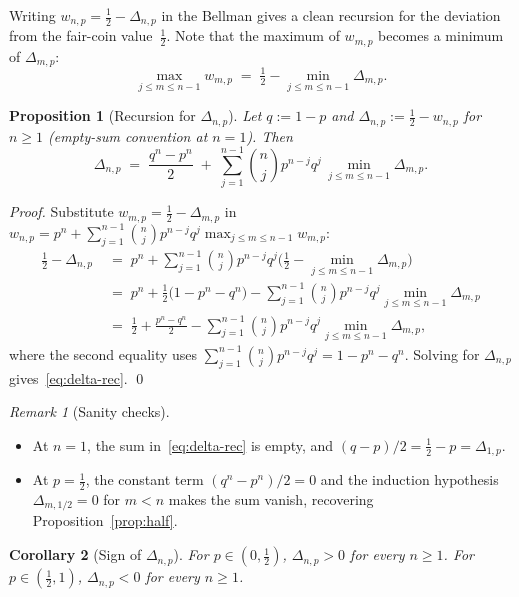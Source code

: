 \documentclass{article}
\newtheorem{proposition}{Proposition}
\newtheorem{corollary}[proposition]{Corollary}
\theoremstyle{remark}
\newtheorem*{remark}{Remark}
\begin{document}
Writing $w_{n,p}=\tfrac12-\Delta_{n,p}$ in the Bellman gives a clean
recursion for the deviation from the fair-coin value~$\tfrac12$. Note
that the maximum of $w_{m,p}$ becomes a minimum of $\Delta_{m,p}$:
\[
  \max_{j\le m\le n-1}w_{m,p}\;=\;\tfrac12-\min_{j\le m\le n-1}\Delta_{m,p}.
\]

\begin{proposition}[Recursion for $\Delta_{n,p}$]\label{prop:delta-rec}
Let $q:=1-p$ and $\Delta_{n,p}:=\tfrac12-w_{n,p}$ for $n\ge 1$
(empty-sum convention at $n=1$). Then
\begin{equation}\label{eq:delta-rec}
  \Delta_{n,p}\;=\;\frac{q^n-p^n}{2}
  \;+\;\sum_{j=1}^{n-1}\binom{n}{j}p^{n-j}q^{j}\,
       \min_{j\le m\le n-1}\Delta_{m,p}.
\end{equation}
\end{proposition}

\begin{proof}
Substitute $w_{m,p}=\tfrac12-\Delta_{m,p}$ in
$w_{n,p}=p^n+\sum_{j=1}^{n-1}\binom{n}{j}p^{n-j}q^{j}\max_{j\le m\le n-1}w_{m,p}$:
\begin{align*}
  \tfrac12-\Delta_{n,p}
  &\;=\;p^n+\sum_{j=1}^{n-1}\binom{n}{j}p^{n-j}q^{j}
       \bigl(\tfrac12-\min_{j\le m\le n-1}\Delta_{m,p}\bigr)\\
  &\;=\;p^n+\tfrac12\bigl(1-p^n-q^n\bigr)
       -\sum_{j=1}^{n-1}\binom{n}{j}p^{n-j}q^{j}\min_{j\le m\le n-1}\Delta_{m,p}\\
  &\;=\;\tfrac12+\frac{p^n-q^n}{2}
       -\sum_{j=1}^{n-1}\binom{n}{j}p^{n-j}q^{j}\min_{j\le m\le n-1}\Delta_{m,p},
\end{align*}
where the second equality uses $\sum_{j=1}^{n-1}\binom{n}{j}p^{n-j}q^{j}=1-p^n-q^n$.
Solving for $\Delta_{n,p}$ gives~\eqref{eq:delta-rec}. \qed
\end{proof}

\begin{remark}[Sanity checks]\hfill
\begin{itemize}
  \item At $n=1$, the sum in~\eqref{eq:delta-rec} is empty, and
        $(q-p)/2=\tfrac12-p=\Delta_{1,p}$.
  \item At $p=\tfrac12$, the constant term $(q^n-p^n)/2=0$ and the
        induction hypothesis $\Delta_{m,1/2}=0$ for $m<n$ makes the sum
        vanish, recovering Proposition~\ref{prop:half}.
\end{itemize}
\end{remark}

\begin{corollary}[Sign of $\Delta_{n,p}$]\label{cor:delta-sign}
For $p\in(0,\tfrac12)$, $\Delta_{n,p}>0$ for every $n\ge 1$. For
$p\in(\tfrac12,1)$, $\Delta_{n,p}<0$ for every $n\ge 1$.
\end{corollary}
\end{document}
